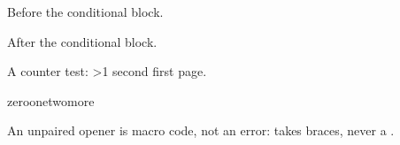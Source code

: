 Before the conditional block.

After the conditional block.

A counter test: \ifnum\value{page}>1 second \else first \fi page.

\newif\if@draft
\if@draft \typeout{draft} \else {} \fi

\ifcase\value{step}\relax zero\or one\or two\else more\fi

An unpaired opener is macro code, not an error: \def\stopit{\fi}
 takes braces, never a \string\fi.
